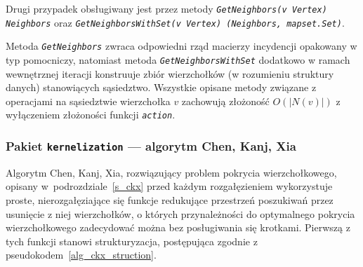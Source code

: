 {{    Drugi przypadek obsługiwany jest przez metody \textit{\lstinline{GetNeighbors(v Vertex) Neighbors}} oraz \textit{\lstinline{GetNeighborsWithSet(v Vertex) (Neighbors, mapset.Set)}}.

    Metoda \textit{\lstinline{GetNeighbors}} zwraca odpowiedni rząd macierzy incydencji opakowany w typ pomocniczy, natomiast metoda \textit{\lstinline{GetNeighborsWithSet}} dodatkowo w ramach wewnętrznej iteracji konstruuje zbiór wierzchołków (w rozumieniu struktury danych) stanowiących sąsiedztwo.
    Wszystkie opisane metody związane z operacjami na sąsiedztwie wierzchołka $v$ zachowują złożoność $O(|N(v)|)$ z wyłączeniem złożoności funkcji \textit{\lstinline{action}}.
  }
}
\subsubsection{\textbf{Pakiet \texttt{kernelization} --- algorytm Chen, Kanj, Xia}}
\label{sss_internals_ckx}
\par{
  Algorytm Chen, Kanj, Xia, rozwiązujący problem pokrycia wierzchołkowego, opisany w~podrozdziale~\ref{s_ckx} przed każdym rozgałęzieniem wykorzystuje proste, nierozgałęziające się funkcje redukujące przestrzeń poszukiwań przez usunięcie z niej wierzchołków, o których przynależności do optymalnego pokrycia wierzchołkowego zadecydować można bez posługiwania się krotkami.
  Pierwszą z tych funkcji stanowi strukturyzacja, postępująca zgodnie z pseudokodem~\ref{alg_ckx_struction}.
}

